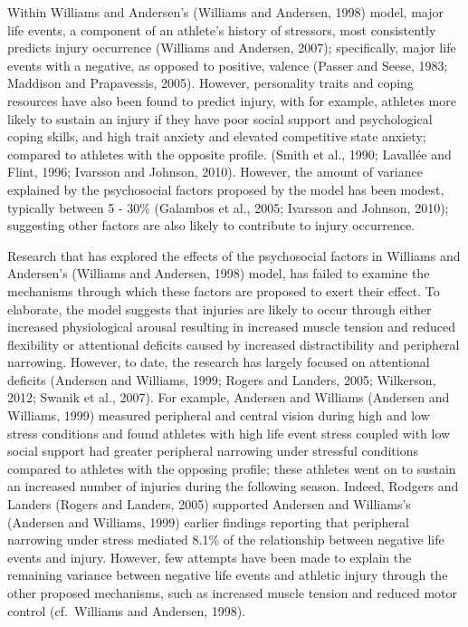 \documentclass[utf8]{frontiersHLTH}
\begin{document}
Within Williams and Andersen's (Williams and Andersen, 1998) model,
major life events, a component of an athlete's history of stressors,
most consistently predicts injury occurrence (Williams and Andersen,
2007); specifically, major life events with a negative, as opposed to
positive, valence (Passer and Seese, 1983; Maddison and Prapavessis,
2005). However, personality traits and coping resources have also been
found to predict injury, with for example, athletes more likely to
sustain an injury if they have poor social support and psychological
coping skills, and high trait anxiety and elevated competitive state
anxiety; compared to athletes with the opposite profile. (Smith et al.,
1990; Lavallée and Flint, 1996; Ivarsson and Johnson, 2010). However,
the amount of variance explained by the psychosocial factors proposed by
the model has been modest, typically between 5 - 30\% (Galambos et al.,
2005; Ivarsson and Johnson, 2010); suggesting other factors are also
likely to contribute to injury occurrence.

Research that has explored the effects of the psychosocial factors in
Williams and Andersen's (Williams and Andersen, 1998) model, has failed
to examine the mechanisms through which these factors are proposed to
exert their effect. To elaborate, the model suggests that injuries are
likely to occur through either increased physiological arousal resulting
in increased muscle tension and reduced flexibility or attentional
deficits caused by increased distractibility and peripheral narrowing.
However, to date, the research has largely focused on attentional
deficits (Andersen and Williams, 1999; Rogers and Landers, 2005;
Wilkerson, 2012; Swanik et al., 2007). For example, Andersen and
Williams (Andersen and Williams, 1999) measured peripheral and central
vision during high and low stress conditions and found athletes with
high life event stress coupled with low social support had greater
peripheral narrowing under stressful conditions compared to athletes
with the opposing profile; these athletes went on to sustain an
increased number of injuries during the following season. Indeed,
Rodgers and Landers (Rogers and Landers, 2005) supported Andersen and
Williams's (Andersen and Williams, 1999) earlier findings reporting that
peripheral narrowing under stress mediated 8.1\% of the relationship
between negative life events and injury. However, few attempts have been
made to explain the remaining variance between negative life events and
athletic injury through the other proposed mechanisms, such as increased
muscle tension and reduced motor control (cf.~Williams and Andersen,
1998).
\end{document}
